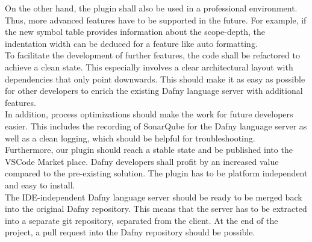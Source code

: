 On the other hand, the plugin shall also be used in a professional environment.
Thus, more advanced features have to be supported in the future.
For example, if the new symbol table provides information about the scope-depth, the indentation width can be deduced for a feature like auto formatting.\\

To facilitate the development of further features, the code shall be refactored to achieve a clean state.
This especially involves a clear architectural layout with dependencies that only point downwards.
This should make it as easy as possible for other developers to enrich the existing Dafny language server with additional features. \\

In addition, process optimizations should make the work for future developers easier.
This includes the recording of SonarQube for the Dafny language server as well as a clean logging,
which should be helpful for troubleshooting.\\

Furthermore, our plugin should reach a stable state and be published into the VSCode Market place.
Dafny developers shall profit by an increased value compared to the pre-existing solution.
The plugin has to be platform independent and easy to install. \\

The IDE-independent Dafny language server should be ready to be merged back into the original Dafny repository.
This means that the server has to be extracted into a separate git repository, separated from the client.
At the end of the project, a pull request into the Dafny repository should be possible.

